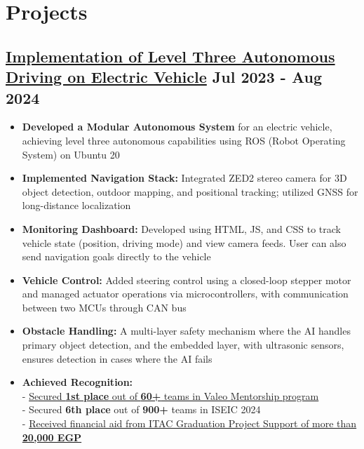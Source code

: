 \section*{Projects}
%
%
%
\subsection*{
  \href{https://github.com/Bumbleboss/autonomous-vehicle/}{Implementation of Level Three Autonomous Driving on Electric Vehicle}
  \hspace*{\fill}
  \dateformat Jul 2023 - Aug 2024
}
\begin{itemize}
  \item \textbf{Developed a Modular Autonomous System} for an electric vehicle, achieving level three autonomous capabilities using ROS (Robot Operating System) on Ubuntu 20
  \item \textbf{Implemented Navigation Stack:} Integrated ZED2 stereo camera for 3D object detection, outdoor mapping, and positional tracking; utilized GNSS for long-distance localization
  \item \textbf{Monitoring Dashboard:} Developed using HTML, JS, and CSS to track vehicle state (position, driving mode) and view camera feeds. User can also send navigation goals directly to the vehicle
  \item \textbf{Vehicle Control:} Added steering control using a closed-loop stepper motor and managed actuator operations via microcontrollers, with communication between two MCUs through CAN bus
  \item \textbf{Obstacle Handling:} A multi-layer safety mechanism where the AI handles primary object detection, and the embedded layer, with ultrasonic sensors, ensures detection in cases where the AI fails
  \item \textbf{Achieved Recognition:}\\
    - \href{https://www.linkedin.com/feed/update/urn:li:activity:7230237292680933376/}{Secured \textbf{1st place} out of \textbf{60+} teams in Valeo Mentorship program}\\
    - Secured \textbf{6th place} out of \textbf{900+} teams in ISEIC 2024\\
    - \href{https://itida.gov.eg/English/Programs/Graduation/Documents/List-of-Accepted-Graduation-Projects-Round-19-new.pdf}{Received financial aid from ITAC Graduation Project Support of more than \textbf{20,000 EGP}}
\end{itemize}
%
%
